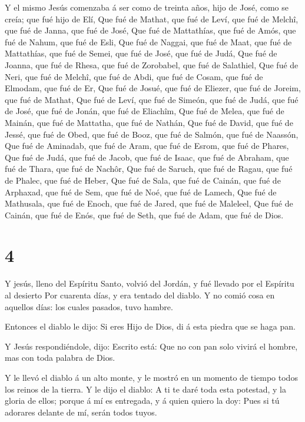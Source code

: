  Y el mismo Jesús comenzaba á ser como de treinta años,
hijo de José, como se creía; que fué hijo de Elí,  Que fué
de Mathat, que fué de Leví, que fué de Melchî, que fué de Janna, que fué
de José,  Que fué de Mattathías, que fué de Amós, que fué
de Nahum, que fué de Esli,  Que fué de Naggai, que fué de
Maat, que fué de Mattathías, que fué de Semei, que fué de José, que fué
de Judá,  Que fué de Joanna, que fué de Rhesa, que fué de
Zorobabel, que fué de Salathiel,  Que fué de Neri, que fué
de Melchî, que fué de Abdi, que fué de Cosam, que fué de Elmodam, que
fué de Er,  Que fué de Josué, que fué de Eliezer, que fué
de Joreim, que fué de Mathat,  Que fué de Leví, que fué de
Simeón, que fué de Judá, que fué de José, que fué de Jonán, que fué de
Eliachîm,  Que fué de Melea, que fué de Mainán, que fué de
Mattatha, que fué de Nathán,  Que fué de David, que fué de
Jessé, que fué de Obed, que fué de Booz, que fué de Salmón, que fué de
Naassón,  Que fué de Aminadab, que fué de Aram, que fué de
Esrom, que fué de Phares,  Que fué de Judá, que fué de
Jacob, que fué de Isaac, que fué de Abraham, que fué de Thara, que fué
de Nachôr,  Que fué de Saruch, que fué de Ragau, que fué de
Phalec, que fué de Heber,  Que fué de Sala, que fué de
Cainán, que fué de Arphaxad, que fué de Sem, que fué de Noé, que fué de
Lamech,  Que fué de Mathusala, que fué de Enoch, que fué de
Jared, que fué de Maleleel,  Que fué de Cainán, que fué de
Enós, que fué de Seth, que fué de Adam, que fué de Dios.

\hypertarget{section-3}{%
\section{4}\label{section-3}}

 Y jesús, lleno del Espíritu Santo, volvió del Jordán, y fué
llevado por el Espíritu al desierto  Por cuarenta días, y
era tentado del diablo. Y no comió cosa en aquellos días: los cuales
pasados, tuvo hambre.

 Entonces el diablo le dijo: Si eres Hijo de Dios, di á esta
piedra que se haga pan.

 Y Jesús respondiéndole, dijo: Escrito está: Que no con pan
solo vivirá el hombre, mas con toda palabra de Dios.

 Y le llevó el diablo á un alto monte, y le mostró en un
momento de tiempo todos los reinos de la tierra.  Y le dijo
el diablo: A ti te daré toda esta potestad, y la gloria de ellos; porque
á mí es entregada, y á quien quiero la doy:  Pues si tú
adorares delante de mí, serán todos tuyos.

